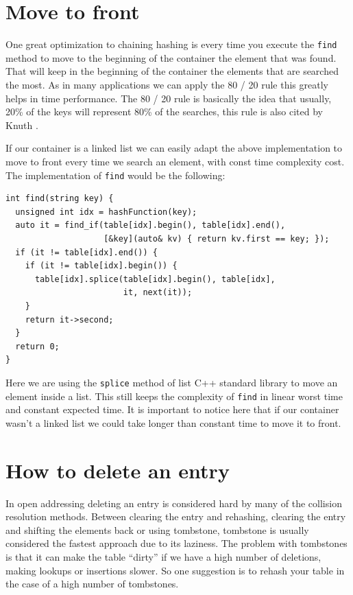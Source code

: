 

\section{Move to front}

One great optimization to chaining hashing is every time you execute the \texttt{find} method to move to the beginning of the container the element that was found. That will keep in the beginning of the container the elements that are searched the most. As in many applications we can apply the 80 / 20 rule this greatly helps in time performance. The 80 / 20 rule is basically the idea that usually, 20\% of the keys will represent 80\% of the searches, this rule is also cited by Knuth \citep{TAOCP3}.

If our container is a linked list we can easily adapt the above implementation to move to front every time we search an element, with const time complexity cost. The implementation of \texttt{find} would be the following:

\begin{lstlisting}
int find(string key) {
  unsigned int idx = hashFunction(key);
  auto it = find_if(table[idx].begin(), table[idx].end(),
                    [&key](auto& kv) { return kv.first == key; });
  if (it != table[idx].end()) {
    if (it != table[idx].begin()) {
      table[idx].splice(table[idx].begin(), table[idx],
                        it, next(it));
    }
    return it->second;
  }
  return 0;
}
\end{lstlisting}

Here we are using the \texttt{splice} method of list C++ standard library to move an element inside a list. This still keeps the complexity of \texttt{find} in linear worst time and constant expected time. It is important to notice here that if our container wasn't a linked list we could take longer than constant time to move it to front.


\section{How to delete an entry}

In open addressing deleting an entry is considered hard by many of the collision resolution methods. Between clearing the entry and rehashing, clearing the entry and shifting the elements back or using tombstone, tombstone is usually considered the fastest approach due to its laziness.
The problem with tombstones is that it can make the table ``dirty'' if we have a high number of deletions, making lookups or insertions slower. So one suggestion is to rehash your table in the case of a high number of tombstones.

